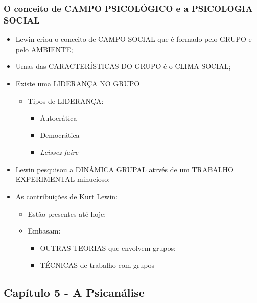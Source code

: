 \documentclass[
]{book}
\providecommand{\tightlist}{%
  \setlength{\itemsep}{0pt}\setlength{\parskip}{0pt}}
\begin{document}
\hypertarget{o-conceito-de-campo-psicoluxf3gico-e-a-psicologia-social}{%
\subsubsection{O conceito de CAMPO PSICOLÓGICO e a PSICOLOGIA SOCIAL}\label{o-conceito-de-campo-psicoluxf3gico-e-a-psicologia-social}}

\begin{itemize}
\tightlist
\item
  Lewin criou o conceito de CAMPO SOCIAL que é formado pelo GRUPO e pelo AMBIENTE;
\item
  Umas das CARACTERÍSTICAS DO GRUPO é o CLIMA SOCIAL;
\item
  Existe uma LIDERANÇA NO GRUPO

  \begin{itemize}
  \tightlist
  \item
    Tipos de LIDERANÇA:

    \begin{itemize}
    \tightlist
    \item
      Autocrática
    \item
      Democrática
    \item
      \emph{Leissez-faire}
    \end{itemize}
  \end{itemize}
\item
  Lewin pesquisou a DINÂMICA GRUPAL atrvés de um TRABALHO EXPERIMENTAL minucioso;
\item
  As contribuições de Kurt Lewin:

  \begin{itemize}
  \tightlist
  \item
    Estão presentes até hoje;
  \item
    Embasam:

    \begin{itemize}
    \tightlist
    \item
      OUTRAS TEORIAS que envolvem grupos;
    \item
      TÉCNICAS de trabalho com grupos
    \end{itemize}
  \end{itemize}
\end{itemize}

\hypertarget{capuxedtulo-5---a-psicanuxe1lise}{%
\subsection{Capítulo 5 - A Psicanálise}\label{capuxedtulo-5---a-psicanuxe1lise}}
\end{document}
